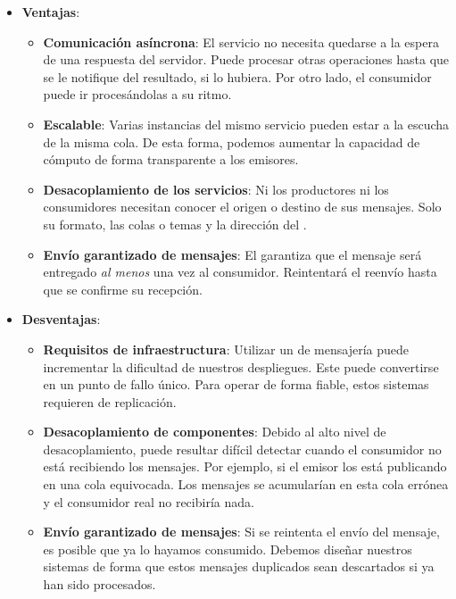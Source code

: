 \begin{itemize}
  \item \textbf{Ventajas}:

  \begin{itemize}
    \item \textbf{Comunicación asíncrona}: El servicio no necesita quedarse a la espera de una respuesta del servidor. Puede procesar otras operaciones hasta que se le notifique del resultado, si lo hubiera. Por otro lado, el consumidor puede ir procesándolas a su ritmo.

    \item \textbf{Escalable}: Varias instancias del mismo servicio pueden estar a la escucha de la misma cola. De esta forma, podemos aumentar la capacidad de cómputo de forma transparente a los emisores.

    \item \textbf{Desacoplamiento de los servicios}: Ni los productores ni los consumidores necesitan conocer el origen o destino de sus mensajes. Solo su formato, las colas o temas y la dirección del .

    \item \textbf{Envío garantizado de mensajes}: El  garantiza que el mensaje será entregado \emph{al menos} una vez al consumidor. Reintentará el reenvío hasta que se confirme su recepción.

  \end{itemize}

  \item \textbf{Desventajas}:

  \begin{itemize}
    \item \textbf{Requisitos de infraestructura}: Utilizar un  de mensajería puede incrementar la dificultad de nuestros despliegues. Este puede convertirse en un punto de fallo único. Para operar de forma fiable, estos sistemas requieren de replicación. \cite{newmanBuildingMicroservicesDesigning2021}

    \item \textbf{Desacoplamiento de componentes}: Debido al alto nivel de desacoplamiento, puede resultar difícil detectar cuando el consumidor no está recibiendo los mensajes. Por ejemplo, si el emisor los está publicando en una cola equivocada. Los mensajes se acumularían en esta cola errónea y el consumidor real no recibiría nada.

    \item \textbf{Envío garantizado de mensajes}: Si se reintenta el envío del mensaje, es posible que ya lo hayamos consumido. Debemos diseñar nuestros sistemas de forma que estos mensajes duplicados sean descartados si ya han sido procesados.
  \end{itemize}
\end{itemize}

